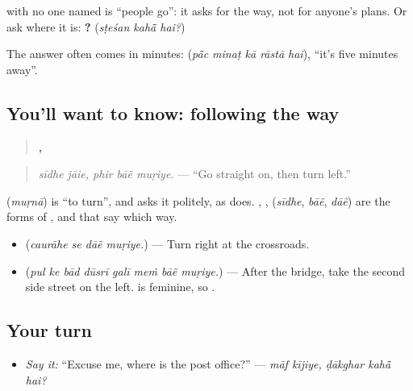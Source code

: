\textbf{ } with no one named is \textquotedblleft{}people go\textquotedblright{}: it asks for the way, not for anyone's plans. Or ask where it is: \textbf{  ?} (\emph{sṭeśan kahā̃ hai?})

The answer often comes in minutes: \textbf{    } (\emph{pā̃c minaṭ kā rāstā hai}), \textquotedblleft{}it's five minutes away\textquotedblright{}.

\subsection*{You'll want to know: following the way}
\begin{quote}
\textbf{ ,   }
\end{quote}

\begin{quote}
\emph{sīdhe jāie, phir bāẽ muṛiye.} — \textquotedblleft{}Go straight on, then turn left.\textquotedblright{}
\end{quote}

\textbf{} (\emph{muṛnā}) is \textquotedblleft{}to turn\textquotedblright{}, and \textbf{} asks it politely, as \textbf{} does. \textbf{}, \textbf{}, \textbf{} (\emph{sīdhe}, \emph{bāẽ}, \emph{dāẽ}) are the forms of \textbf{}, \textbf{} and \textbf{} that say which way.

\begin{itemize}
\raggedright
  \item \textbf{   } (\emph{caurāhe se dāẽ muṛiye.}) — Turn right at the crossroads.
  \item \textbf{       } (\emph{pul ke bād dūsrī galī meṁ bāẽ muṛiye.}) — After the bridge, take the second side street on the left. \textbf{} is feminine, so \textbf{}.
\end{itemize}

\subsection*{Your turn}
\begin{itemize}
\raggedright
  \item \emph{Say it:} \textquotedblleft{}Excuse me, where is the post office?\textquotedblright{} — \emph{māf kījiye, ḍākghar kahā̃ hai?}
\end{itemize}

